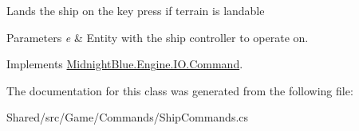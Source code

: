 Lands the ship on the key press if terrain is landable 


\begin{DoxyParams}{Parameters}
{\em e} & Entity with the ship controller to operate on.\\
\hline
\end{DoxyParams}


Implements \hyperlink{class_midnight_blue_1_1_engine_1_1_i_o_1_1_command_ae641d2c1a9db17f03ee6b7854b00a9d2}{Midnight\+Blue.\+Engine.\+I\+O.\+Command}.



The documentation for this class was generated from the following file\+:\begin{DoxyCompactItemize}
\item 
Shared/src/\+Game/\+Commands/Ship\+Commands.\+cs\end{DoxyCompactItemize}
